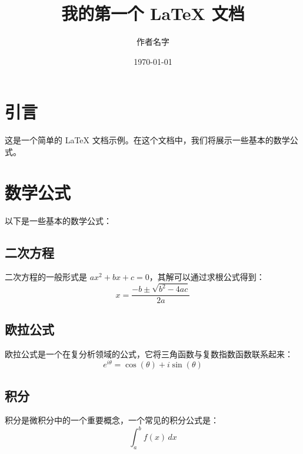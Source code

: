 \documentclass{article}
\begin{document}
\title{我的第一个 LaTeX 文档}
\author{作者名字}
\date{\today}
\maketitle

\section{引言}
这是一个简单的 LaTeX 文档示例。在这个文档中，我们将展示一些基本的数学公式。

\section{数学公式}
以下是一些基本的数学公式：

\subsection{二次方程}
二次方程的一般形式是 \( ax^2 + bx + c = 0 \)，其解可以通过求根公式得到：
\[ x = \frac{-b \pm \sqrt{b^2 - 4ac}}{2a} \]

\subsection{欧拉公式}
欧拉公式是一个在复分析领域的公式，它将三角函数与复数指数函数联系起来：
\[ e^{i\theta} = \cos(\theta) + i\sin(\theta) \]

\subsection{积分}
积分是微积分中的一个重要概念，一个常见的积分公式是：
\[ \int_{a}^{b} f(x) \, dx \]
\end{document}
